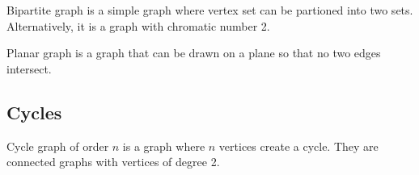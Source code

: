\medskip

{\color{def}Bipartite graph} is a simple graph where vertex set can be partioned into two sets. Alternatively, it is a graph with chromatic number 2.\medskip

{\color{def}Planar graph} is a graph that can be drawn on a plane so that no two edges intersect.

\subsection{Cycles}

{\color{def}Cycle graph} of order $n$ is a graph where $n$ vertices create a cycle. They are connected graphs with vertices of degree 2.\bigskip